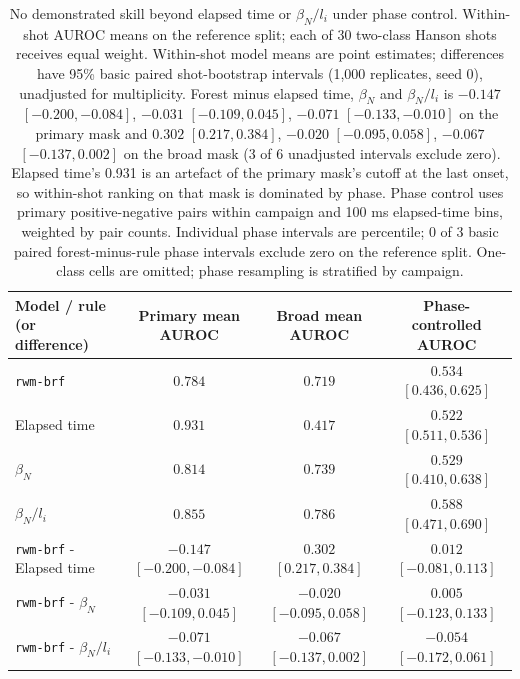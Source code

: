 \begin{table}[t]
\centering
\small
\setlength{\tabcolsep}{4pt}
\begin{tabular}{@{}lccc@{}}
\toprule
Model / rule (or difference) & Primary mean AUROC & Broad mean AUROC & Phase-controlled AUROC \\
\midrule
\texttt{rwm-brf} & $0.784$ & $0.719$ & $0.534$ {\scriptsize $[0.436, 0.625]$} \\
Elapsed time & $0.931$ & $0.417$ & $0.522$ {\scriptsize $[0.511, 0.536]$} \\
$\beta_N$ & $0.814$ & $0.739$ & $0.529$ {\scriptsize $[0.410, 0.638]$} \\
$\beta_N/l_i$ & $0.855$ & $0.786$ & $0.588$ {\scriptsize $[0.471, 0.690]$} \\
\texttt{rwm-brf} - Elapsed time & $-0.147$ {\scriptsize $[-0.200, -0.084]$} & $0.302$ {\scriptsize $[0.217, 0.384]$} & $0.012$ {\scriptsize $[-0.081, 0.113]$} \\
\texttt{rwm-brf} - $\beta_N$ & $-0.031$ {\scriptsize $[-0.109, 0.045]$} & $-0.020$ {\scriptsize $[-0.095, 0.058]$} & $0.005$ {\scriptsize $[-0.123, 0.133]$} \\
\texttt{rwm-brf} - $\beta_N/l_i$ & $-0.071$ {\scriptsize $[-0.133, -0.010]$} & $-0.067$ {\scriptsize $[-0.137, 0.002]$} & $-0.054$ {\scriptsize $[-0.172, 0.061]$} \\
\bottomrule
\end{tabular}
\caption{No demonstrated skill beyond elapsed time or $\beta_N/l_i$ under phase control. Within-shot AUROC means on the reference split; each of 30 two-class Hanson shots receives equal weight. Within-shot model means are point estimates; differences have 95\% basic paired shot-bootstrap intervals (1,000 replicates, seed 0), unadjusted for multiplicity. Forest minus elapsed time, $\beta_N$ and $\beta_N/l_i$ is $-0.147$ $[-0.200, -0.084]$, $-0.031$ $[-0.109, 0.045]$, $-0.071$ $[-0.133, -0.010]$ on the primary mask and $0.302$ $[0.217, 0.384]$, $-0.020$ $[-0.095, 0.058]$, $-0.067$ $[-0.137, 0.002]$ on the broad mask (3 of 6 unadjusted intervals exclude zero). Elapsed time's 0.931 is an artefact of the primary mask's cutoff at the last onset, so within-shot ranking on that mask is dominated by phase. Phase control uses primary positive-negative pairs within campaign and 100 ms elapsed-time bins, weighted by pair counts. Individual phase intervals are percentile; 0 of 3 basic paired forest-minus-rule phase intervals exclude zero on the reference split. One-class cells are omitted; phase resampling is stratified by campaign.}
\end{table}
